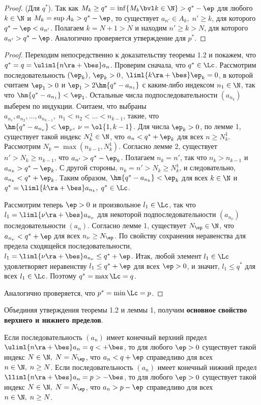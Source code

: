 \documentclass[a4paper]{article}
\begin{document}
\begin{proof}
(Для $q^*$). Так как $M_k \ge q^* = \inf \{M_k \bvl k\in\N \} > q^*
- \ep$ для любого $k\in\N$ и $M_k = \sup A_k > q^* - \ep$, то
существует $a_{n'} \in A_k, \; n'\ge k$, для которого $q^* - \ep <
a_{n'}$. Полагаем $k=N+1>N$ и находим $n' \ge k > N$, для которого
$a_{n'} > q^* - \ep$. Аналогично проверяется утверждение для $p^*$.
\end{proof}

\begin{proof}
Переходим непосредственно к доказательству теоремы 1.2 и покажем,
что $q^*=q=\uliml{n\ra+\bes}a_n$. Проверим сначала, что $q^* \in
\Lc$. Рассмотрим последовательность $(\ep_k)$, $\ep_k>0$,
$\liml{k\ra+\bes} \ep_k=0$, в которой считаем $\ep_1>0$ и $\ep_1 > 2
\hm{q^*-a_{n_1}}$ с каким-либо индексом $n_1\in\N$, так что
$\hm{q^*-a_{n_1}}<\ep_1$. Остальные числа подпоследовательности
$(a_{n_k})$ выберем по индукции. Считаем, что выбраны
$a_{n_1},a_{n_2},\ldots,a_{n_{k-1}}, \; n_1<n_2<\ldots<n_{k-1}$,
такие, что $\hm{q^*-a_{n_{\nu}}}<\ep_{\nu}, \; \nu=\ol{1,k-1}$. Для
числа $\ep_k>0$, по лемме 1, существует такой индекс $N^1_k \in \N$,
что $a_n<q^*+\ep_k$ для всех $n\ge N^1_k$. Рассмотрим
$N_k=\max(n_{k-1}, N^1_k)$. Согласно лемме 2, существует $n'>N_k\ge
n_{k-1}$, что $a_{n'}>q^*-\ep_k$. Полагаем $n_k=n'$, так что $n_k >
n_{k-1}$ и $a_{n_k}>q^* - \ep_k$. С другой стороны, $n_k=n' > N_k
\ge N^1_k$, и следовательно, $a_{n_k}<q^*+\ep_k$. Таким образом,
$\hm{q^*-a_{n_k}}<\ep_k$ для всех $k\in\N$ и $q^*=\liml{k\ra+\bes}
a_{n_k}, \; q^*\in\Lc$.

Рассмотрим теперь $\ep>0$ и произвольное $l_1\in\Lc$, так что
$l_1=\liml{\nu\ra+\bes} a_{n_{\nu}}$ для некоторой
подпоследовательности $(a_{n_{\nu}})$ последовательности $(a_n)$.
Согласно лемме 1, существует $N_{\ep}\in\N$, что $a_{n_\nu} < q^* +
\ep$ для всех $n_{\nu} \ge N_{\ep}$. По свойству сохранения
неравенства для предела сходящейся последовательности, $l_1 =
\liml{\nu\ra+\bes} a_{n_{\nu}} \le q^* + \ep$. Итак, любой элемент
$l_1\in\Lc$ удовлетворяет неравенству $l_1 \le q^* + \ep$ для всех
$\ep>0$, и значит, $l_1 \le q^*$ для всех $l_1\in\Lc$. Поэтому
$q^*=\max\Lc=q$.

Аналогично проверяется, что $p^*=\min\Lc=p$.
\end{proof}

Объединяя утверждения теоремы 1.2 и леммы 1, получим
\textbf{основное свойство верхнего и нижнего пределов}.

\begin{theorem}
Если последовательность $(a_n)$ имеет конечный верхний предел
$\uliml{n\ra+\bes}a_n = q<+\bes$, то для любого $\ep>0$ существует
такой индекс $N\in\N, \; N=N_{\ep}$, что $a_n<q+\ep$ справедливо для
всех $n\in\N, \; n\ge N$. Если последовательность $(a_n)$ имеет
конечный нижний предел $\lliml{n\ra+\bes}a_n = p>-\bes$, то для
любого $\ep>0$ существует такой индекс $N\in\N, \; N=N_{\ep}$, что
$a_n>p-\ep$ справедливо для всех $n\in\N, \; n\ge N$.
\end{theorem}
\end{document}
